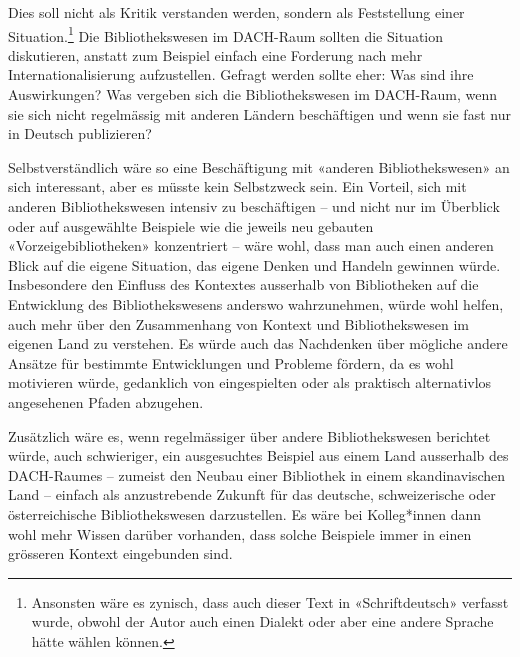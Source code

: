 \documentclass[a4paper,
fontsize=11pt,
oneside,
numbers=noperiodatend,
parskip=half-,
bibliography=totoc,
final
]{scrartcl}
\begin{document}
Dies soll nicht als Kritik verstanden werden, sondern als Feststellung
einer Situation.\footnote{Ansonsten wäre es zynisch, dass auch dieser
  Text in «Schriftdeutsch» verfasst wurde, obwohl der Autor auch einen
  Dialekt oder aber eine andere Sprache hätte wählen können.} Die
Bibliothekswesen im DACH-Raum sollten die Situation diskutieren, anstatt
zum Beispiel einfach eine Forderung nach mehr Internationalisierung
aufzustellen. Gefragt werden sollte eher: Was sind ihre Auswirkungen?
Was vergeben sich die Bibliothekswesen im DACH-Raum, wenn sie sich nicht
regelmässig mit anderen Ländern beschäftigen und wenn sie fast nur in
Deutsch publizieren?

Selbstverständlich wäre so eine Beschäftigung mit «anderen
Bibliothekswesen» an sich interessant, aber es müsste kein Selbstzweck
sein. Ein Vorteil, sich mit anderen Bibliothekswesen intensiv zu
beschäftigen -- und nicht nur im Überblick oder auf ausgewählte
Beispiele wie die jeweils neu gebauten «Vorzeigebibliotheken»
konzentriert -- wäre wohl, dass man auch einen anderen Blick auf die
eigene Situation, das eigene Denken und Handeln gewinnen würde.
Insbesondere den Einfluss des Kontextes ausserhalb von Bibliotheken auf
die Entwicklung des Bibliothekswesens anderswo wahrzunehmen, würde wohl
helfen, auch mehr über den Zusammenhang von Kontext und Bibliothekswesen
im eigenen Land zu verstehen. Es würde auch das Nachdenken über mögliche
andere Ansätze für bestimmte Entwicklungen und Probleme fördern, da es
wohl motivieren würde, gedanklich von eingespielten oder als praktisch
alternativlos angesehenen Pfaden abzugehen.

Zusätzlich wäre es, wenn regelmässiger über andere Bibliothekswesen
berichtet würde, auch schwieriger, ein ausgesuchtes Beispiel aus einem
Land ausserhalb des DACH-Raumes -- zumeist den Neubau einer Bibliothek
in einem skandinavischen Land -- einfach als anzustrebende Zukunft für
das deutsche, schweizerische oder österreichische Bibliothekswesen
darzustellen. Es wäre bei Kolleg*innen dann wohl mehr Wissen darüber
vorhanden, dass solche Beispiele immer in einen grösseren Kontext
eingebunden sind.
\end{document}
